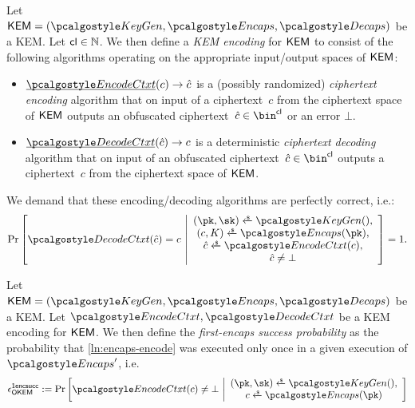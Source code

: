 \begin{definition}
\label{def:kem-encoding}
    Let $\KEM = (\kgen, \encaps, \decaps)$ be a KEM.
    Let $\mathsf{cl} \in \mathbb N$.
    We then define a \emph{KEM encoding} for $\mathsf{KEM}$ to consist of the following algorithms operating on the appropriate input/output spaces of $\mathsf{KEM}$:
    \begin{itemize}
        \item $\ul{\encodectxt}(c) \to \hat c$
        is a (possibly randomized) \emph{ciphertext encoding} algorithm that on input of a ciphertext~$c$ from the ciphertext space of $\mathsf{KEM}$ outputs an obfuscated ciphertext~$\hat c \in \bin^{\obfctxtlen}$ or an error $\bot$.
        \item $\ul{\decodectxt}(\hat c) \to c$
        is a deterministic \emph{ciphertext decoding} algorithm that on input of an obfuscated ciphertext~$\hat c \in \bin^{\obfctxtlen}$ outputs a ciphertext~$c$ from the ciphertext space of $\mathsf{KEM}$.
    \end{itemize}

    We demand that these encoding/decoding algorithms are perfectly correct, i.e.:
    \[
        \Pr\left[
            \decodectxt(\hat c) = c
        ~\middle|
            \begin{array}{c}
                (\pk, \sk) \getsr \kgen(),\\
                (c, K) \getsr \encaps(\pk),\\
                \hat c \getsr \encodectxt(c),\\
                \hat c \neq \bot
            \end{array}
        \right] = 1.
    \]
\end{definition}

\begin{definition}
\label{def:first-encaps-success}
    Let $\KEM = (\kgen, \encaps, \decaps)$ be a KEM.
    Let $\encodectxt, \decodectxt$ be a KEM encoding for $\mathsf{KEM}$.
    We then define the \emph{first-encaps success probability} as the probability that \cref{ln:encaps-encode} was executed only once in a given execution of $\encaps'$, i.e.
    \[
        \epsilon^\firstencapssuccess_\OKEM :=
        \Pr\left[
            \encodectxt(c) \neq \bot
        ~\middle|
            \begin{array}{c}
                (\pk, \sk) \getsr \kgen(), \\
                c \getsr \encaps(\pk)
            \end{array}
        \right]
    \]
\end{definition}


